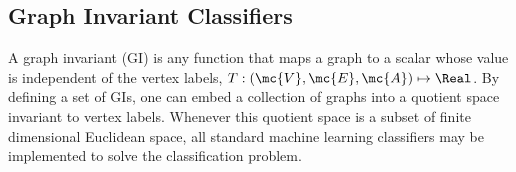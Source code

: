 \documentclass[10pt,journal,cspaper,compsoc]{IEEEtran}
\begin{document}


\subsection{Graph Invariant Classifiers} %
\label{sub:graph_invariants}

A graph invariant (GI) is any function that maps a graph to a scalar whose value is independent of the vertex labels, $T: (\mc{V},\mc{E},\mc{A}) \mapsto \Real$.  By defining a set of GIs, one can embed a collection of graphs into a quotient space invariant to vertex labels.  Whenever this quotient space is a subset of finite dimensional Euclidean space, all standard machine learning classifiers may be implemented to solve the classification problem.  
\end{document}
